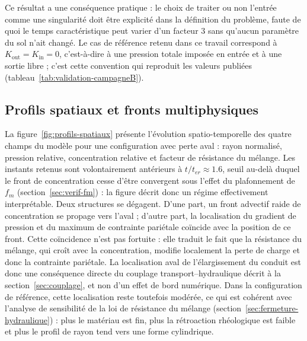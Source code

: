 \documentclass[11pt,a4paper]{report}
\newcommand{\kout}{K_{\mathrm{out}}}
\newcommand{\kin}{K_{\mathrm{in}}}
\newcommand{\ter}{{t_{er}}}
\begin{document}
Ce résultat a une conséquence pratique : le choix de traiter ou non l'entrée comme une singularité doit
être explicité dans la définition du problème, faute de quoi le temps caractéristique peut varier d'un
facteur \(3\) sans qu'aucun paramètre du sol n'ait changé. Le cas de référence retenu dans ce travail
correspond à \(\kout = \kin = 0\), c'est-à-dire à une pression totale imposée en entrée et à
une sortie libre ; c'est cette convention qui reproduit les valeurs publiées
(tableau~\ref{tab:validation-campagneB}).

\subsection{Profils spatiaux et fronts multiphysiques}

La figure~\ref{fig:profils-spatiaux} présente l'évolution spatio-temporelle des quatre champs du modèle
pour une configuration avec perte aval : rayon normalisé, pression relative, concentration relative et
facteur de résistance du mélange. Les instants retenus sont volontairement antérieurs à
\(t/\ter \approx 1.6\), seuil au-delà duquel le front de concentration cesse d'être convergent sous
l'effet du plafonnement de \(f_m\) (section~\ref{sec:verif-fm}) : la figure décrit donc un régime
effectivement interprétable. Deux structures se dégagent. D'une part, un front advectif raide de
concentration se propage vers l'aval ; d'autre part, la localisation du gradient de pression et du
maximum de contrainte pariétale coïncide avec la position de ce front. Cette coïncidence n'est pas fortuite :
elle traduit le fait que la résistance du mélange, qui croît avec la concentration, modifie localement la
perte de charge et donc la contrainte pariétale. La localisation aval de l'élargissement du conduit est donc
une conséquence directe du couplage transport--hydraulique décrit à la section~\ref{sec:couplage}, et non
d'un effet de bord numérique. Dans la configuration de référence, cette localisation reste toutefois
modérée, ce qui est cohérent avec l'analyse de sensibilité de la loi de résistance du mélange
(section~\ref{sec:fermeture-hydraulique}) : plus le matériau est fin, plus la rétroaction rhéologique est
faible et plus le profil de rayon tend vers une forme cylindrique.
\end{document}
